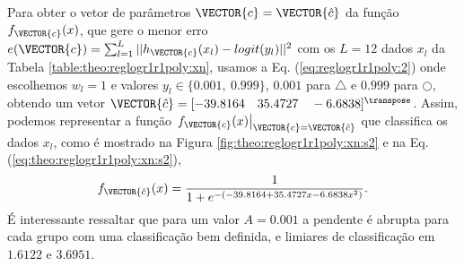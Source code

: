 \begin{SolutionT}\label{sol:theo:reglogr1r1poly:s2}
Para obter o vetor de parâmetros $\VECTOR{c}=\VECTOR{\hat{c}}$ da função $f_{\VECTOR{c}}(x)$, 
que gere o menor erro $e(\VECTOR{c}) =   \sum_{l=1}^{L} ||h_{\VECTOR{c}}(x_l)-logit(y_l)||^2$
com os $L=12$ dados $x_l$ da Tabela \ref{table:theo:reglogr1r1poly:xn},
usamos a Eq. (\ref{eq:reglogr1r1poly:2}) onde escolhemos $w_l=1$ e valores $y_l \in \{0.001,~ 0.999\}$,
$0.001$ para $\bigtriangleup$ e $0.999$ para $\bigcirc$,
obtendo um vetor $\VECTOR{\hat{c}}=[-39.8164\quad 35.4727\quad -6.6838]^{\transpose}$. 
Assim, podemos representar a função $\left.f_{\VECTOR{c}}(x)\right|_{\VECTOR{c}=\VECTOR{\hat{c}}}$ que classifica os dados $x_l$, 
como é mostrado na Figura \ref{fig:theo:reglogr1r1poly:xn:s2} e na Eq. (\ref{eq:theo:reglogr1r1poly:xn:s2}),
\begin{equation}\label{eq:theo:reglogr1r1poly:xn:s2}
f_{\VECTOR{\hat{c}}}(x)= \frac{1}{1+e^{-(-39.8164+35.4727 x -6.6838 x^2)}}.
\end{equation}
É interessante ressaltar que para um valor $A=0.001$ a pendente é abrupta para cada grupo com uma classificação bem definida,
e limiares de classificação em $1.6122$ e $3.6951$.
\end{SolutionT}
